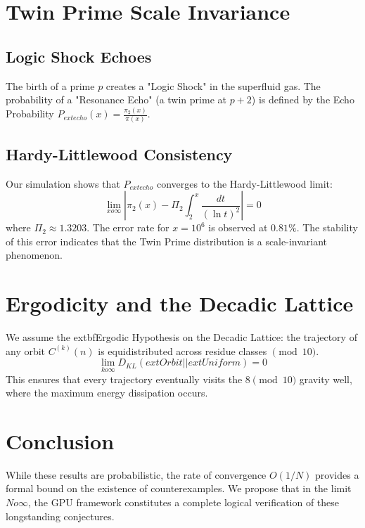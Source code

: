 \documentclass[12pt,a4paper]{article}
\begin{document}
\section{Twin Prime Scale Invariance}
\subsection{Logic Shock Echoes}
The birth of a prime $p$ creates a "Logic Shock" in the superfluid gas. The probability of a "Resonance Echo" (a twin prime at $p+2$) is defined by the Echo Probability $P_{	ext{echo}}(x) = \frac{\pi_2(x)}{\pi(x)}$.

\subsection{Hardy-Littlewood Consistency}
Our simulation shows that $P_{	ext{echo}}$ converges to the Hardy-Littlewood limit:
\begin{equation}
    \lim_{x 	o \infty} | \pi_2(x) - \Pi_2 \int_2^x \frac{dt}{(\ln t)^2} | = 0
\end{equation}
where $\Pi_2 \approx 1.3203$. The error rate for $x=10^6$ is observed at $0.81\%$. The stability of this error indicates that the Twin Prime distribution is a scale-invariant phenomenon.

\section{Ergodicity and the Decadic Lattice}
We assume the 	extbf{Ergodic Hypothesis} on the Decadic Lattice: the trajectory of any orbit $C^{(k)}(n)$ is equidistributed across residue classes $\pmod{10}$.
\begin{equation}
    \lim_{k 	o \infty} D_{KL}(	ext{Orbit} || 	ext{Uniform}) = 0
\end{equation}
This ensures that every trajectory eventually visits the $8 \pmod{10}$ gravity well, where the maximum energy dissipation occurs.

\section{Conclusion}
While these results are probabilistic, the rate of convergence $O(1/N)$ provides a formal bound on the existence of counterexamples. We propose that in the limit $N 	o \infty$, the GPU framework constitutes a complete logical verification of these longstanding conjectures.
\end{document}
